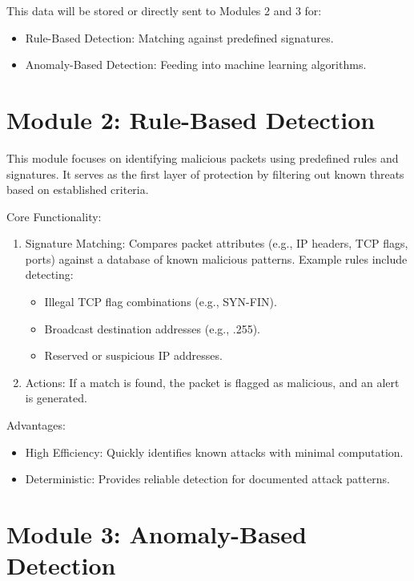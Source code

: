 \documentclass[oneside, english]{reports/assets/sdqtechreport}
\begin{document}
This data will be stored or directly sent to Modules 2 and 3 for:

\begin{itemize}
	\item Rule-Based Detection: Matching against predefined signatures.
	\item Anomaly-Based Detection: Feeding into machine learning algorithms.
\end{itemize}
\section{Module 2: Rule-Based Detection}
\label{sec:RuleBasedDetection}

This module focuses on identifying malicious packets using predefined rules and
signatures. It serves as the first layer of protection by filtering out known
threats based on established criteria.

Core Functionality:
\begin{enumerate}
	\item Signature Matching: Compares packet attributes (e.g., IP headers, TCP flags,
	      ports) against a database of known malicious patterns. Example rules include
	      detecting:
	      \begin{itemize}
		      \item Illegal TCP flag combinations (e.g., SYN-FIN).
		      \item Broadcast destination addresses (e.g., .255).
		      \item Reserved or suspicious IP addresses.
	      \end{itemize}
	\item Actions: If a match is found, the packet is flagged as malicious, and an alert
	      is generated.
\end{enumerate}

Advantages:

\begin{itemize}
	\item High Efficiency: Quickly identifies known attacks with minimal computation.
	\item Deterministic: Provides reliable detection for documented attack patterns.
\end{itemize}
\section{Module 3: Anomaly-Based Detection}
\label{sec:AnomalyBasedDetection}
\end{document}
